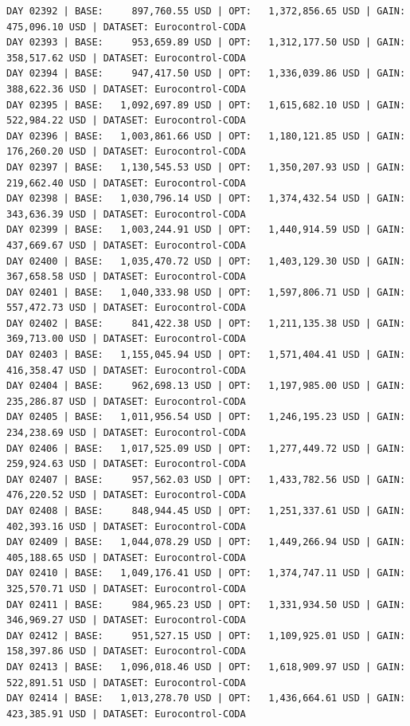 \documentclass[11pt,a4paper]{article}
\begin{document}
\begin{verbatim}
DAY 02392 | BASE:     897,760.55 USD | OPT:   1,372,856.65 USD | GAIN: 475,096.10 USD | DATASET: Eurocontrol-CODA
DAY 02393 | BASE:     953,659.89 USD | OPT:   1,312,177.50 USD | GAIN: 358,517.62 USD | DATASET: Eurocontrol-CODA
DAY 02394 | BASE:     947,417.50 USD | OPT:   1,336,039.86 USD | GAIN: 388,622.36 USD | DATASET: Eurocontrol-CODA
DAY 02395 | BASE:   1,092,697.89 USD | OPT:   1,615,682.10 USD | GAIN: 522,984.22 USD | DATASET: Eurocontrol-CODA
DAY 02396 | BASE:   1,003,861.66 USD | OPT:   1,180,121.85 USD | GAIN: 176,260.20 USD | DATASET: Eurocontrol-CODA
DAY 02397 | BASE:   1,130,545.53 USD | OPT:   1,350,207.93 USD | GAIN: 219,662.40 USD | DATASET: Eurocontrol-CODA
DAY 02398 | BASE:   1,030,796.14 USD | OPT:   1,374,432.54 USD | GAIN: 343,636.39 USD | DATASET: Eurocontrol-CODA
DAY 02399 | BASE:   1,003,244.91 USD | OPT:   1,440,914.59 USD | GAIN: 437,669.67 USD | DATASET: Eurocontrol-CODA
DAY 02400 | BASE:   1,035,470.72 USD | OPT:   1,403,129.30 USD | GAIN: 367,658.58 USD | DATASET: Eurocontrol-CODA
DAY 02401 | BASE:   1,040,333.98 USD | OPT:   1,597,806.71 USD | GAIN: 557,472.73 USD | DATASET: Eurocontrol-CODA
DAY 02402 | BASE:     841,422.38 USD | OPT:   1,211,135.38 USD | GAIN: 369,713.00 USD | DATASET: Eurocontrol-CODA
DAY 02403 | BASE:   1,155,045.94 USD | OPT:   1,571,404.41 USD | GAIN: 416,358.47 USD | DATASET: Eurocontrol-CODA
DAY 02404 | BASE:     962,698.13 USD | OPT:   1,197,985.00 USD | GAIN: 235,286.87 USD | DATASET: Eurocontrol-CODA
DAY 02405 | BASE:   1,011,956.54 USD | OPT:   1,246,195.23 USD | GAIN: 234,238.69 USD | DATASET: Eurocontrol-CODA
DAY 02406 | BASE:   1,017,525.09 USD | OPT:   1,277,449.72 USD | GAIN: 259,924.63 USD | DATASET: Eurocontrol-CODA
DAY 02407 | BASE:     957,562.03 USD | OPT:   1,433,782.56 USD | GAIN: 476,220.52 USD | DATASET: Eurocontrol-CODA
DAY 02408 | BASE:     848,944.45 USD | OPT:   1,251,337.61 USD | GAIN: 402,393.16 USD | DATASET: Eurocontrol-CODA
DAY 02409 | BASE:   1,044,078.29 USD | OPT:   1,449,266.94 USD | GAIN: 405,188.65 USD | DATASET: Eurocontrol-CODA
DAY 02410 | BASE:   1,049,176.41 USD | OPT:   1,374,747.11 USD | GAIN: 325,570.71 USD | DATASET: Eurocontrol-CODA
DAY 02411 | BASE:     984,965.23 USD | OPT:   1,331,934.50 USD | GAIN: 346,969.27 USD | DATASET: Eurocontrol-CODA
DAY 02412 | BASE:     951,527.15 USD | OPT:   1,109,925.01 USD | GAIN: 158,397.86 USD | DATASET: Eurocontrol-CODA
DAY 02413 | BASE:   1,096,018.46 USD | OPT:   1,618,909.97 USD | GAIN: 522,891.51 USD | DATASET: Eurocontrol-CODA
DAY 02414 | BASE:   1,013,278.70 USD | OPT:   1,436,664.61 USD | GAIN: 423,385.91 USD | DATASET: Eurocontrol-CODA

\end{verbatim}
\end{document}
